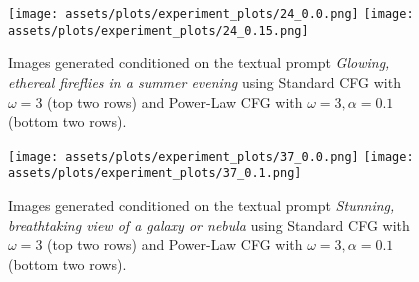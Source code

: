 \begin{figure}[htbp]
    \centering
    \begin{minipage}{.9\linewidth}
    \centering
        \texttt{[image: assets/plots/experiment\_plots/24\_0.0.png]}
        \texttt{[image: assets/plots/experiment\_plots/24\_0.15.png]} 
        \vspace{-.25cm}
        \caption{Images generated conditioned on the textual prompt \textit{Glowing, ethereal fireflies in a summer evening} using Standard CFG with $\omega=3$ (top two rows) and Power-Law CFG with $\omega=3, \alpha=0.1$ (bottom two rows).}
        \vspace{0.5cm}
    \end{minipage}
    
    
    \begin{minipage}{\linewidth}
        \centering
        \texttt{[image: assets/plots/experiment\_plots/37\_0.0.png]}
        \texttt{[image: assets/plots/experiment\_plots/37\_0.1.png]} 
        \vspace{-.25cm}
        \caption{Images generated conditioned on the textual prompt \textit{Stunning, breathtaking view of a galaxy or nebula} using Standard CFG with $\omega=3$ (top two rows) and Power-Law CFG with $\omega=3, \alpha=0.1$ (bottom two rows).}
    \end{minipage}
\end{figure}